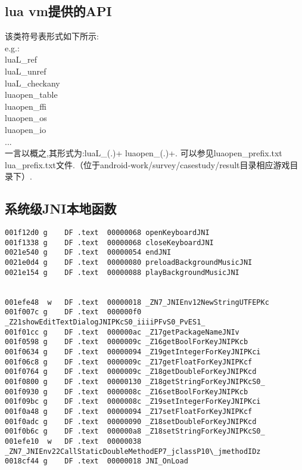\subsection{lua vm提供的API}
\label{sec:so:lualib}

该类符号表形式如下所示:\\
e.g.:\\
	luaL\_ref\\
	luaL\_unref\\
	luaL\_checkany\\
	luaopen\_table\\
	luaopen\_ffi\\
	luaopen\_os\\
	luaopen\_io\\
	...\\
一言以概之,其形式为:luaL\_(.)+ luaopen\_(.)+.
可以参见luaopen\_prefix.txt  lua\_prefix.txt文件.（位于android-work/survey/casestudy/result目录相应游戏目录下）.

\subsection{系统级JNI本地函数}
\label{sec:so:sysjnilib}
\begin{lstlisting}
001f12d0 g    DF .text  00000068 openKeyboardJNI
001f1338 g    DF .text  00000068 closeKeyboardJNI
0021e540 g    DF .text  00000054 endJNI
0021e0d4 g    DF .text  00000080 preloadBackgroundMusicJNI
0021e154 g    DF .text  00000088 playBackgroundMusicJNI


001efe48  w   DF .text  00000018 _ZN7_JNIEnv12NewStringUTFEPKc
001f007c g    DF .text  000000f0 _Z21showEditTextDialogJNIPKcS0_iiiiPFvS0_PvES1_
001f01cc g    DF .text  000000ac _Z17getPackageNameJNIv
001f0598 g    DF .text  0000009c _Z16getBoolForKeyJNIPKcb
001f0634 g    DF .text  00000094 _Z19getIntegerForKeyJNIPKci
001f06c8 g    DF .text  0000009c _Z17getFloatForKeyJNIPKcf
001f0764 g    DF .text  0000009c _Z18getDoubleForKeyJNIPKcd
001f0800 g    DF .text  00000130 _Z18getStringForKeyJNIPKcS0_
001f0930 g    DF .text  0000008c _Z16setBoolForKeyJNIPKcb
001f09bc g    DF .text  0000008c _Z19setIntegerForKeyJNIPKci
001f0a48 g    DF .text  00000094 _Z17setFloatForKeyJNIPKcf
001f0adc g    DF .text  00000090 _Z18setDoubleForKeyJNIPKcd
001f0b6c g    DF .text  000000a8 _Z18setStringForKeyJNIPKcS0_
001efe10  w   DF .text  00000038 _ZN7_JNIEnv22CallStaticDoubleMethodEP7_jclassP10\_jmethodIDz
0018cf44 g    DF .text  00000018 JNI_OnLoad
\end{lstlisting}

